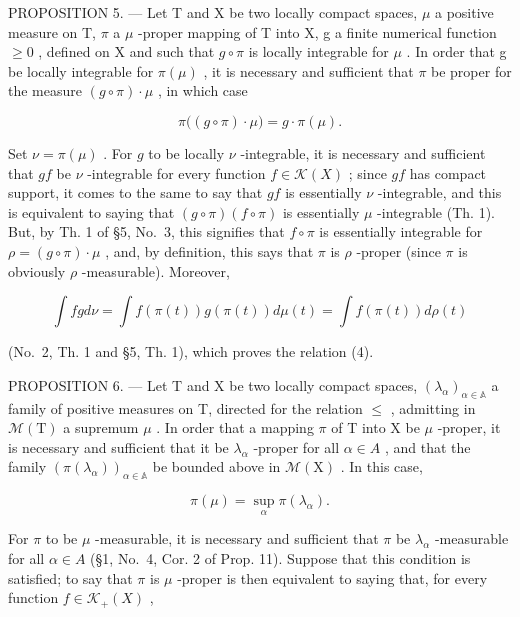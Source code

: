 PROPOSITION 5. --- Let T and X be two locally compact spaces, \(\mu\) a positive measure on T, \(\pi\) a \(\mu\) -proper mapping of T into X, g a finite numerical function \(\geqslant 0\) , defined on X and such that \(g \circ \pi\) is locally integrable for \(\mu\) . In order that g be locally integrable for \(\pi(\mu)\) , it is necessary and sufficient that \(\pi\) be proper for the measure \((g \circ \pi) \cdot \mu\) , in which case

\[
\pi \big ((g \circ \pi) \cdot \mu \big) = g \cdot \pi (\mu).\tag{4}
\]

Set \(\nu = \pi(\mu)\) . For \(g\) to be locally \(\nu\) -integrable, it is necessary and sufficient that \(gf\) be \(\nu\) -integrable for every function \(f \in \mathcal{K}(X)\) ; since \(gf\) has compact support, it comes to the same to say that \(gf\) is essentially \(\nu\) -integrable, and this is equivalent to saying that \((g \circ \pi)(f \circ \pi)\) is essentially \(\mu\) -integrable (Th. 1). But, by Th. 1 of §5, No.~3, this signifies that \(f \circ \pi\) is essentially integrable for \(\rho = (g \circ \pi) \cdot \mu\) , and, by definition, this says that \(\pi\) is \(\rho\) -proper (since \(\pi\) is obviously \(\rho\) -measurable). Moreover,

\[
\int f g d \nu = \int f (\pi (t)) g (\pi (t)) d \mu (t) = \int f (\pi (t)) d \rho (t)
\]

(No.~2, Th. 1 and §5, Th. 1), which proves the relation (4).

PROPOSITION 6. --- Let T and X be two locally compact spaces, \((\lambda_{\alpha})_{\alpha\in\mathbb{A}}\) a family of positive measures on T, directed for the relation \(\leqslant\) , admitting in \(\mathcal{M}(\mathrm{T})\) a supremum \(\mu\) . In order that a mapping \(\pi\) of T into X be \(\mu\) -proper, it is necessary and sufficient that it be \(\lambda_{\alpha}\) -proper for all \(\alpha\in A\) , and that the family \(\left(\pi(\lambda_{\alpha})\right)_{\alpha\in\mathbb{A}}\) be bounded above in \(\mathcal{M}(\mathrm{X})\) . In this case,

\[
\pi (\mu) = \sup _ {\alpha} \pi (\lambda_ {\alpha}).\tag{5}
\]

For \(\pi\) to be \(\mu\) -measurable, it is necessary and sufficient that \(\pi\) be \(\lambda_{\alpha}\) -measurable for all \(\alpha \in A\) (§1, No.~4, Cor. 2 of Prop. 11). Suppose that this condition is satisfied; to say that \(\pi\) is \(\mu\) -proper is then equivalent to saying that, for every function \(f \in \mathcal{K}_{+}(X)\) ,

